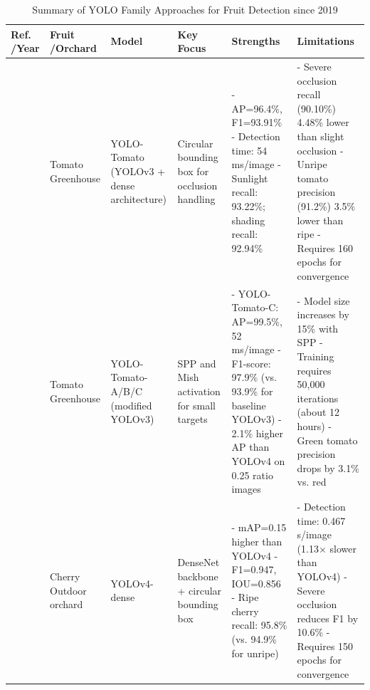 \documentclass{ieeeaccess}
\begin{document}
\iffalse
\begin{table}[htbp]
	\centering
	\footnotesize
	\caption{Summary of YOLO Family Approaches for Fruit Detection since 2019} 
	\label{tab:yolo-based}
	\begin{tabular}{@{}p{}p{}p{}p{}p{}p{}@{}}
	\toprule
	\textbf{Ref. \newline /Year} & \textbf{Fruit \newline /Orchard} & \textbf{Model} & \textbf{Key Focus} & \textbf{Strengths} & \textbf{Limitations} \\ \midrule
	
	\cite{liu2020yolo} \newline 2020 & Tomato \newline Greenhouse & YOLO-Tomato (YOLOv3 + dense architecture) & Circular bounding box for occlusion handling & - AP=96.4\%, F1=93.91\% \newline - Detection time: 54 ms/image \newline - Sunlight recall: 93.22\%; shading recall: 92.94\% & - Severe occlusion recall (90.10\%) 4.48\% lower than slight occlusion \newline - Unripe tomato precision (91.2\%) 3.5\% lower than ripe \newline - Requires 160 epochs for convergence \\ \midrule
	\cite{lawal2021tomato} \newline 2021 & Tomato \newline Greenhouse & YOLO-Tomato-A/B/C (modified YOLOv3) & SPP and Mish activation for small targets & - YOLO-Tomato-C: AP=99.5\%, 52 ms/image \newline - F1-score: 97.9\% (vs. 93.9\% for baseline YOLOv3) \newline - 2.1\% higher AP than YOLOv4 on 0.25 ratio images & - Model size increases by 15\% with SPP \newline - Training requires 50,000 iterations (about 12 hours) \newline - Green tomato precision drops by 3.1\% vs. red \\ \midrule
	\cite{gai2023detection} \newline 2023 & Cherry \newline Outdoor orchard & YOLOv4-dense & DenseNet backbone + circular bounding box & - mAP=0.15 higher than YOLOv4 \newline - F1=0.947, IOU=0.856 \newline - Ripe cherry recall: 95.8\% (vs. 94.9\% for unripe) & - Detection time: 0.467 s/image (1.13× slower than YOLOv4) \newline - Severe occlusion reduces F1 by 10.6\% \newline - Requires 150 epochs for convergence \\ \midrule

\end{tabular}
\end{table}
\end{document}
